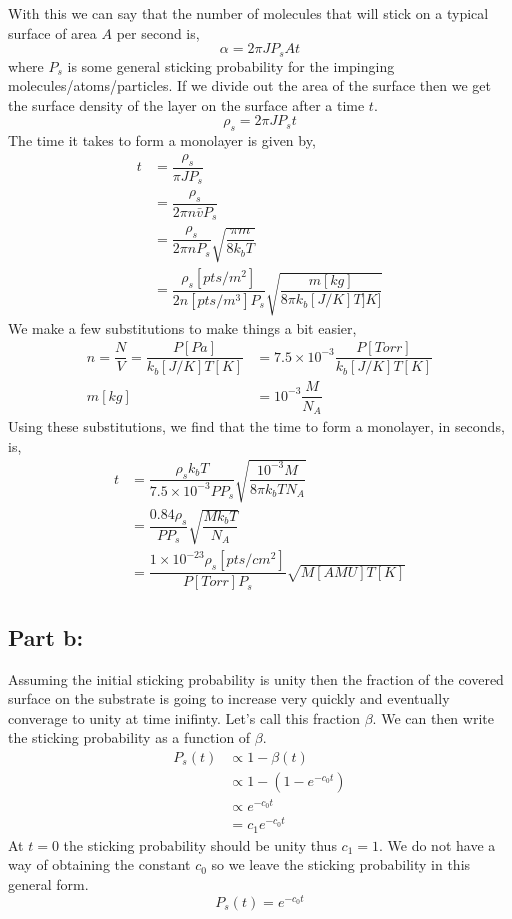 \documentclass[12pt]{article}
\renewcommand{\=}[1]{\stackrel{#1}{=}} %
\theoremstyle{definition}
\theoremstyle{remark}
\begin{document}
With this we can say that the number of molecules that will stick on a typical surface of area $A$ per second is,
\[
	\alpha = 2\pi J P_s At
\]
where $P_s$ is some general sticking probability for the impinging molecules/atoms/particles. If we divide out the area of the surface then we get the surface density of the layer on the surface after a time $t$.
\[
	\rho_s = 2\pi JP_s t
\]
The time it takes to form a monolayer is given by,
\begin{align*}
	t &= \dfrac{\rho_s}{\pi JP_s}\\[3mm]
		&= \dfrac{\rho_s}{2\pi n\bar{v} P_s}\\[3mm]
		&= \dfrac{\rho_s}{2\pi n P_s}\sqrt{\dfrac{\pi m}{8k_bT}}\\[3mm]
		&= \dfrac{\rho_{s}[pts/m^2]}{2n[pts/m^3]P_s}\sqrt{\dfrac{m[kg]}{8\pi k_b[J/K] T]K]}}
\end{align*}
We make a few substitutions to make things a bit easier,
\begin{align*}
	n = \dfrac{N}{V} = \dfrac{P[Pa]}{k_b[J/K] T[K]} &= 7.5\times10^{-3} \dfrac{P[Torr]}{k_b[J/K]T[K]}\\[3mm]
	m[kg] &= 10^{-3}\dfrac{M}{N_A}
\end{align*}
Using these substitutions, we find that the time to form a monolayer, in seconds, is,
\begin{align*}
	t &= \dfrac{\rho_sk_b T}{7.5\times10^{-3}PP_s}\sqrt{\dfrac{10^{-3}M}{8\pi k_bTN_A}}\\[3mm]
		&= \dfrac{0.84 \rho_s }{PP_s}\sqrt{\dfrac{Mk_bT}{N_A}}\\[3mm]
		&= \dfrac{1\times10^{-23}\rho_s[pts/cm^2]}{P[Torr]P_s}\sqrt{M[AMU]T[K]}
\end{align*}


\subsection*{Part b:}

Assuming the initial sticking probability is unity then the fraction of the covered surface on the substrate is going to increase very quickly and eventually converage to unity at time inifinty. Let's call this fraction $\beta$. We can then write the sticking probability as a function of $\beta$.
\begin{align*}
	P_s(t) &\propto 1-\beta(t)\\[3mm]
		&\propto 1-\left(1-e^{-c_0t}\right)\\[3mm]
		&\propto e^{-c_0t}\\[3mm]
		&= c_1e^{-c_0t}
\end{align*}
At $t=0$ the sticking probability should be unity thus $c_1=1$. We do not have a way of obtaining the constant $c_0$ so we leave the sticking probability in this general form.
\[
	P_s(t) = e^{-c_0t}
\]
\end{document}
